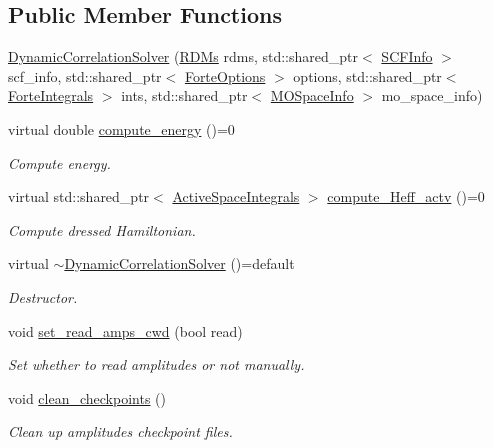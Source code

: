 \subsection*{Public Member Functions}
\begin{DoxyCompactItemize}
\item 
\mbox{\hyperlink{classforte_1_1_dynamic_correlation_solver_a37c8ad39f777f877d32735c342549f8a}{Dynamic\+Correlation\+Solver}} (\mbox{\hyperlink{classforte_1_1_r_d_ms}{R\+D\+Ms}} rdms, std\+::shared\+\_\+ptr$<$ \mbox{\hyperlink{classforte_1_1_s_c_f_info}{S\+C\+F\+Info}} $>$ scf\+\_\+info, std\+::shared\+\_\+ptr$<$ \mbox{\hyperlink{classforte_1_1_forte_options}{Forte\+Options}} $>$ options, std\+::shared\+\_\+ptr$<$ \mbox{\hyperlink{classforte_1_1_forte_integrals}{Forte\+Integrals}} $>$ ints, std\+::shared\+\_\+ptr$<$ \mbox{\hyperlink{classforte_1_1_m_o_space_info}{M\+O\+Space\+Info}} $>$ mo\+\_\+space\+\_\+info)
\item 
virtual double \mbox{\hyperlink{classforte_1_1_dynamic_correlation_solver_aff4c7ebdca64563939d6e3ab8a262150}{compute\+\_\+energy}} ()=0
\begin{DoxyCompactList}\small\item\em Compute energy. \end{DoxyCompactList}\item 
virtual std\+::shared\+\_\+ptr$<$ \mbox{\hyperlink{classforte_1_1_active_space_integrals}{Active\+Space\+Integrals}} $>$ \mbox{\hyperlink{classforte_1_1_dynamic_correlation_solver_a8a66ab912dd2c7c1d35c1428df5a494d}{compute\+\_\+\+Heff\+\_\+actv}} ()=0
\begin{DoxyCompactList}\small\item\em Compute dressed Hamiltonian. \end{DoxyCompactList}\item 
virtual \mbox{\hyperlink{classforte_1_1_dynamic_correlation_solver_a80d76d03ef8046d71525943420c0cae6}{$\sim$\+Dynamic\+Correlation\+Solver}} ()=default
\begin{DoxyCompactList}\small\item\em Destructor. \end{DoxyCompactList}\item 
void \mbox{\hyperlink{classforte_1_1_dynamic_correlation_solver_ab2096aa0b894db57cf747c86f1252e08}{set\+\_\+read\+\_\+amps\+\_\+cwd}} (bool read)
\begin{DoxyCompactList}\small\item\em Set whether to read amplitudes or not manually. \end{DoxyCompactList}\item 
void \mbox{\hyperlink{classforte_1_1_dynamic_correlation_solver_a6c55258f31849caa086b226937f35245}{clean\+\_\+checkpoints}} ()
\begin{DoxyCompactList}\small\item\em Clean up amplitudes checkpoint files. \end{DoxyCompactList}\end{DoxyCompactItemize}
